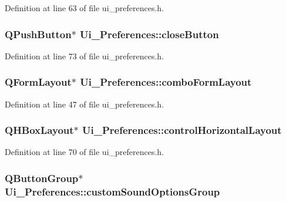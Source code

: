 Definition at line 63 of file ui\_\-preferences.h.

\hypertarget{classUi__Preferences_a63355e36bb93c452d4a383bb77260a7f}{
\subsubsection[{closeButton}]{\setlength{\rightskip}{0pt plus 5cm}QPushButton$\ast$ {\bf Ui\_\-Preferences::closeButton}}}
\label{classUi__Preferences_a63355e36bb93c452d4a383bb77260a7f}


Definition at line 73 of file ui\_\-preferences.h.

\hypertarget{classUi__Preferences_a5c00b5bc1658f27ec4b4e54a8cd7d934}{
\subsubsection[{comboFormLayout}]{\setlength{\rightskip}{0pt plus 5cm}QFormLayout$\ast$ {\bf Ui\_\-Preferences::comboFormLayout}}}
\label{classUi__Preferences_a5c00b5bc1658f27ec4b4e54a8cd7d934}


Definition at line 47 of file ui\_\-preferences.h.

\hypertarget{classUi__Preferences_a3a480e79aca097cfe6d379adb40e520f}{
\subsubsection[{controlHorizontalLayout}]{\setlength{\rightskip}{0pt plus 5cm}QHBoxLayout$\ast$ {\bf Ui\_\-Preferences::controlHorizontalLayout}}}
\label{classUi__Preferences_a3a480e79aca097cfe6d379adb40e520f}


Definition at line 70 of file ui\_\-preferences.h.

\hypertarget{classUi__Preferences_a0cb2fcb5f3ae47ee18b9e90be0d88656}{
\subsubsection[{customSoundOptionsGroup}]{\setlength{\rightskip}{0pt plus 5cm}QButtonGroup$\ast$ {\bf Ui\_\-Preferences::customSoundOptionsGroup}}}
\label{classUi__Preferences_a0cb2fcb5f3ae47ee18b9e90be0d88656}


